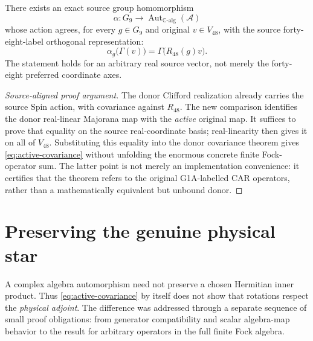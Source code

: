 \begin{theorem}
\label{thm:active-majorana}
There exists an exact source group homomorphism
\[
 \alpha:G_9\longrightarrow\operatorname{Aut}_{\mathbb C\text{-alg}}(\mathscr A)
\]
whose action agrees, for every $g\in G_9$ and original $v\in V_{48}$,
with the source forty-eight-label orthogonal representation:
\begin{equation}\label{eq:active-covariance}
 \alpha_g\bigl(\Gamma(v)\bigr)
   =\Gamma\bigl(R_{48}(g)v\bigr).
\end{equation}
The statement holds for an arbitrary real source vector, not merely
the forty-eight preferred coordinate axes.
\end{theorem}
\begin{proof}[Source-aligned proof argument]
The donor Clifford realization already carries the source Spin action,
with covariance against $R_{48}$. The new comparison identifies the
donor real-linear Majorana map with the \emph{active} original map.
It suffices to prove that equality on the source real-coordinate basis;
real-linearity then gives it on all of $V_{48}$. Substituting this equality
into the donor covariance theorem gives \eqref{eq:active-covariance}
without unfolding the enormous concrete finite Fock-operator sum.
The latter point is not merely an implementation convenience: it
certifies that the theorem refers to the original G1A-labelled CAR
operators, rather than a mathematically equivalent but unbound donor.
\end{proof}

\section{Preserving the genuine physical star}
A complex algebra automorphism need not preserve a chosen Hermitian
inner product. Thus \eqref{eq:active-covariance} by itself does not
show that rotations respect the \emph{physical adjoint}. The difference
was addressed through a separate sequence of small proof obligations:
from generator compatibility and scalar algebra-map behavior to the
result for arbitrary operators in the full finite Fock algebra.

